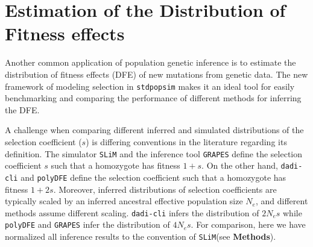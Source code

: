 \documentclass[hidelinks]{article}
\newcommand{\stdpopsim}{\texttt{stdpopsim}\xspace}
\newcommand{\slim}{\texttt{SLiM}\xspace}
\newcommand{\polydfe}{\texttt{polyDFE}\xspace}
\newcommand{\dadicli}{\texttt{dadi-cli}\xspace}
\newcommand{\grapes}{\texttt{GRAPES}\xspace}
\begin{document}
\section*{Estimation of the Distribution of Fitness effects}
    \label{dfe}
    Another common application of population genetic inference is to estimate the distribution of fitness effects (DFE) of new mutations
    from genetic data. The new framework of modeling selection in \stdpopsim makes it an ideal tool for easily benchmarking and comparing
    the performance of different methods for inferring the DFE. 

    A challenge when comparing different inferred and simulated distributions of the selection coefficient ($s$)
    is differing conventions in the literature regarding its definition.
    The simulator \slim and the inference tool \grapes define the selection coefficient $s$ such that a homozygote has fitness $1+s$.
    On the other hand, \dadicli and \polydfe define the selection coefficient such that a homozygote has fitness $1+ 2s$.
    Moreover, inferred distributions of selection coefficients are typically scaled by an inferred ancestral
    effective population size $N_e$, and different methods assume different scaling.
    \dadicli infers the distribution of $2 N_e s$ while \polydfe and \grapes infer the distribution of $4 N_e s$.
    For comparison, here we have normalized all inference results to the convention of \slim (see \textbf{Methods}).
\end{document}
